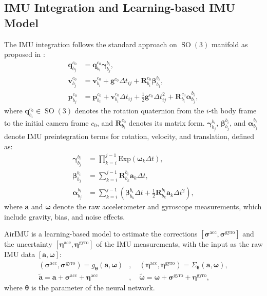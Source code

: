 \subsection{IMU Integration and Learning-based IMU Model}
The IMU integration follows the standard approach on $\operatorname{SO}(3)$ manifold as proposed in \cite{forster_imu}:
\begin{equation}
\label{eq:maci2:imu_integration}
\begin{aligned}
\mathbf{q}^{c_0}_{b_j} &= \mathbf{q}^{c_0}_{b_i} \bm{\gamma}_{b_j}^{b_i}, \\
\mathbf{v}_{b_j}^{c_0} &= \mathbf{v}_{b_i}^{c_0} + \mathbf{g}^{c_0} \Delta t_{ij} + \mathbf{R}^{c_0}_{b_i} \bm{\beta}_{b_j}^{b_i}, \\
\mathbf{p}^{c_0}_{b_{j}} &= \mathbf{p}^{c_0}_{b_i} + \mathbf{v}^{c_0}_{b_i} \Delta t_{ij} + \frac{1}{2} \mathbf{g}^{c_0} \Delta t_{ij}^2 + \mathbf{R}^{c_0}_{b_i} \bm{\alpha}_{b_j}^{b_i},
\end{aligned}
\end{equation}
where $\mathbf{q}_{b_i}^{c_0} \in \operatorname{SO}(3)$ denotes the rotation quaternion from the $i$-th body frame to the initial camera frame $c_0$, and $\mathbf{R}^{c_0}_{b_i}$ denotes its matrix form. $\bm{\gamma}_{b_j}^{b_i}$, $\bm{\beta}_{b_j}^{b_i}$, and $\bm{\alpha}_{b_j}^{b_i}$ denote IMU preintegration terms for rotation, velocity, and translation, defined as:
\begin{equation}
\begin{aligned}
\bm{\gamma}_{b_j}^{b_i} &= \prod\nolimits_{k=i}^{j-1} \text{Exp} \left({\bm{\omega}}_k \Delta t \right), \\
\bm{\beta}_{b_j}^{b_i} &= \sum\nolimits_{k=i}^{j-1} \mathbf{R}^{b_i}_{b_k} \mathbf{a}_k \Delta t,\\
\bm{\alpha}_{b_j}^{b_i} &= \sum\nolimits_{k=i}^{j-1} \left( \bm{\beta}_{b_k}^{b_i} \Delta t + \frac{1}{2} \mathbf{R}^{b_i}_{b_k} \mathbf{a}_k \Delta t^2 \right),
\end{aligned}
\end{equation}
where $\mathbf{a}$ and $\bm{\omega}$ denote the raw accelerometer and gyroscope measurements, which include gravity, bias, and noise effects.

AirIMU \cite{qiu2023airimu} is a learning-based model to estimate the corrections $[\bm{\sigma}^{\text{acc}},\bm{\sigma}^{\text{gyro}}]$ and the uncertainty $[\bm{\eta}^{\text{acc}}, \bm{\eta}^{\text{gyro}}]$ of the IMU measurements, with the input as the raw IMU data $[\mathbf{a}, \bm{\omega}]$:
\begin{equation}
\label{eq:maci2:correction_uncertainty}
\begin{aligned}
(\bm{\sigma}^{\text{acc}},\bm{\sigma}^{\text{gyro}}) = g_{\bm{\theta}} (\mathbf{a},\bm{\omega})&, \quad (\bm{\eta}^{\text{acc}}, \bm{\eta}^{\text{gyro}}) = \Sigma_{\bm{\theta}} (\mathbf{a},\bm{\omega}), \\
\tilde{\mathbf{a}} = \mathbf{a} + \bm{\sigma}^{\text{acc}} + \bm{\eta}^{\text{acc}}&, \quad \tilde{\bm{\omega}} = \bm{\omega} + \bm{\sigma}^{\text{gyro}} + \bm{\eta}^{\text{gyro}},
\end{aligned}
\end{equation}
where $\bm{\theta}$ is the parameter of the neural network.

